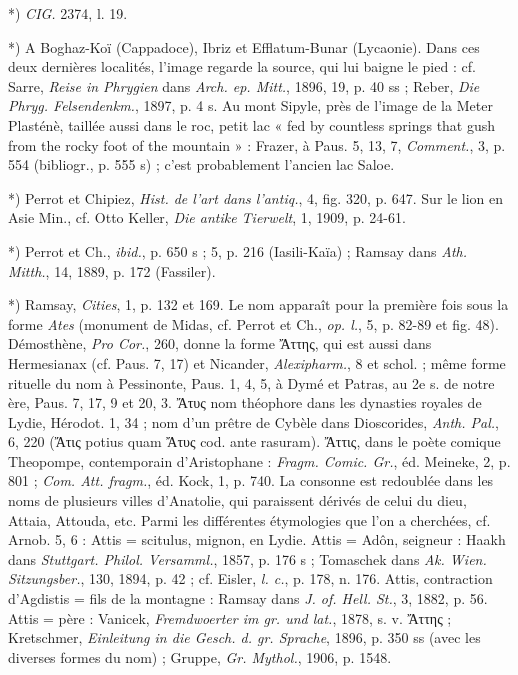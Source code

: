 \documentclass[a4paper, 11pt, oneside, polutonikogreek, french]{article}
\begin{document}
*) \emph{CIG.} 2374, l. 19.

*) A Boghaz-Koï (Cappadoce), Ibriz et Efflatum-Bunar (Lycaonie). Dans ces deux dernières localités, l'image regarde la source, qui lui baigne le pied : cf. Sarre, \emph{Reise in Phrygien} dans \emph{Arch. ep. Mitt.}, 1896, 19, p. 40 ss ; Reber, \emph{Die Phryg. Felsendenkm.}, 1897, p. 4 s. Au mont Sipyle, près de l'image de la Meter Plasténè, taillée aussi dans le roc, petit lac « fed by countless springs that gush from the rocky foot of the mountain » : Frazer, à Paus. 5, 13, 7, \emph{Comment.}, 3, p. 554 (bibliogr., p. 555 s) ; c'est probablement l'ancien lac Saloe.

*) Perrot et Chipiez, \emph{Hist. de l'art dans l'antiq.}, 4, fig. 320, p. 647. Sur le lion en Asie Min., cf. Otto Keller, \emph{Die antike Tierwelt}, 1, 1909, p. 24-61.

*) Perrot et Ch., \emph{ibid.}, p. 650 s ; 5, p. 216 (Iasili-Kaïa) ; Ramsay dans \emph{Ath. Mitth.}, 14, 1889, p. 172 (Fassiler).

*) Ramsay, \emph{Cities}, 1, p. 132 et 169. Le nom apparaît pour la première fois sous la forme \emph{Ates} (monument de Midas, cf. Perrot et Ch., \emph{op. l.}, 5, p. 82-89 et fig. 48). Démosthène, \emph{Pro Cor.}, 260, donne la forme Ἄττης, qui est aussi dans Hermesianax (cf. Paus. 7, 17) et Nicander, \emph{Alexipharm.}, 8 et schol. ; même forme rituelle du nom à Pessinonte, Paus. 1, 4, 5, à Dymé et Patras, au 2e s. de notre ère, Paus. 7, 17, 9 et 20, 3. Ἄτυς nom théophore dans les dynasties royales de Lydie, Hérodot. 1, 34 ; nom d'un prêtre de Cybèle dans Dioscorides, \emph{Anth. Pal.}, 6, 220 (Ἄτις potius quam Ἄτυς cod. ante rasuram). Ἄττις, dans le poète comique Theopompe, contemporain d'Aristophane : \emph{Fragm. Comic. Gr.}, éd. Meineke, 2, p. 801 ; \emph{Com. Att. fragm.}, éd. Kock, 1, p. 740. La consonne est redoublée dans les noms de plusieurs villes d'Anatolie, qui paraissent dérivés de celui du dieu, Attaia, Attouda, etc. Parmi les différentes étymologies que l'on a cherchées, cf. Arnob. 5, 6 : Attis = scitulus, mignon, en Lydie. Attis = Adôn, seigneur : Haakh dans \emph{Stuttgart. Philol. Versamml.}, 1857, p. 176 s ; Tomaschek dans \emph{Ak. Wien. Sitzungsber.}, 130, 1894, p. 42 ; cf. Eisler, \emph{l. c.}, p. 178, n. 176. Attis, contraction d'Agdistis = fils de la montagne : Ramsay dans \emph{J. of. Hell. St.}, 3, 1882, p. 56. Attis = père : Vanicek, \emph{Fremdwoerter im gr. und lat.}, 1878, s. v. Ἄττης ; Kretschmer, \emph{Einleitung in die Gesch. d. gr. Sprache}, 1896, p. 350 ss (avec les diverses formes du nom) ; Gruppe, \emph{Gr. Mythol.}, 1906, p. 1548.
\end{document}
